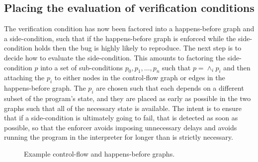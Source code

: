 \subsection{Placing the evaluation of verification conditions}
\label{sect:enforce:place_vcs}

The verification condition has now been factored into a happens-before
graph and a side-condition, such that if the happens-before graph is
enforced while the side-condition holds then the bug is highly likely
to reproduce.  The next step is to decide how to evaluate the
side-condition.  This amounts to factoring the side-condition $p$ into
a set of sub-conditions $p_0, p_1, {\ldots}, p_n$ such that $p =
\wedge_i p_i$ and then attaching the $p_i$ to either nodes in the
control-flow graph or edges in the happens-before
graph.  The $p_i$ are chosen such that each depends on a
different subset of the program's state, and they are placed as early
as possible in the two graphs such that all of the necessary state is
available.  The intent is to ensure that if a side-condition is
ultimately going to fail, that is detected as soon as possible, so
that the enforcer avoids imposing unnecessary delays and avoids
running the program in the interpreter for longer than is strictly
necessary.

\begin{figure}
  \caption{Example control-flow and happens-before graphs.}
  \label{fig:place_conditions_example}
\end{figure}

